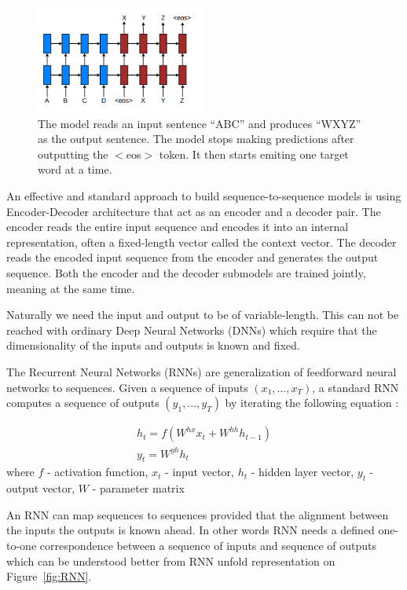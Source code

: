 \begin{figure}[h]
	\centering
	\includegraphics[width=0.5\textwidth]{img/seq-to-seq.png}
	\caption{\label{fig:seq-to-seq}The model reads an input sentence “ABC” and produces “WXYZ” as the output 	sentence. The model stops making predictions after outputting the $<$eos$>$ token. It then starts 		 emiting one target word at a time. }
\end{figure}


An effective and standard approach to build sequence-to-sequence models is using Encoder-Decoder architecture that act as an encoder and a decoder pair. The encoder reads the entire input sequence and encodes it into an internal representation, often a fixed-length vector called the context vector. The decoder reads the encoded input sequence from the encoder and generates the output sequence. Both the encoder and the decoder submodels are trained jointly, meaning at the same time.

Naturally we need the input and output to be of variable-length. This can not be reached with ordinary Deep Neural Networks (DNNs) which require that the dimensionality of the inputs and outputs is known and fixed. 

The Recurrent Neural Networks (RNNs) are generalization of feedforward neural networks to sequences. Given a sequence of inputs $(x_1, ..., x_T)$, a standard RNN computes a
sequence of outputs $(y_1, ..., y_T)$ by iterating the following equation \cite{seq2seq_with_NN} :

\begin{equation}
\begin{array}{l}
	h_t = f(W^{hx}x_t + W^{hh}h_{t-1}) \\
	y_t = W^{yh}h_t
\end{array}
\end{equation}
where 
$f$ - activation function,
$x_{t}$ - input vector, 
$h_{t}$ - hidden layer vector,
$y_{t}$ - output vector,
$W$ - parameter matrix
 
 
An RNN can map sequences to sequences provided that the alignment between the inputs the
outputs is known ahead. In other words RNN needs a defined one-to-one correspondence between a sequence of inputs and sequence of outputs which can be understood better from RNN unfold representation on Figure~\ref{fig:RNN}.

